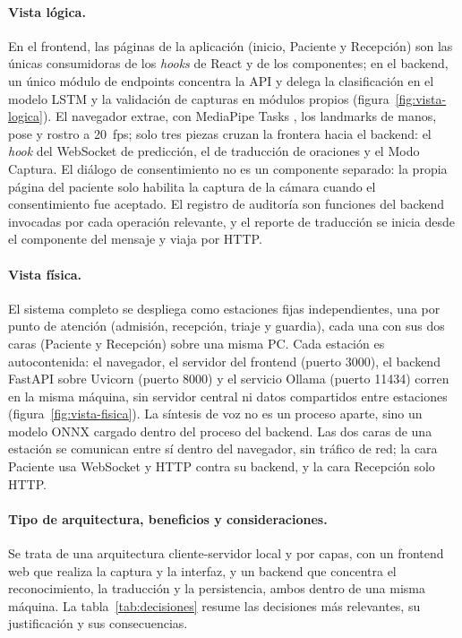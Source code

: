 \paragraph{Vista lógica.} En el frontend, las páginas de la aplicación (inicio, Paciente y Recepción) son las únicas consumidoras de los \emph{hooks} de React y de los componentes; en el backend, un único módulo de endpoints concentra la API y delega la clasificación en el modelo LSTM y la validación de capturas en módulos propios (figura~\ref{fig:vista-logica}). El navegador extrae, con MediaPipe Tasks \parencite{lugaresi2019mediapipe}, los landmarks de manos, pose y rostro a 20~fps; solo tres piezas cruzan la frontera hacia el backend: el \emph{hook} del WebSocket de predicción, el de traducción de oraciones y el Modo Captura. El diálogo de consentimiento no es un componente separado: la propia página del paciente solo habilita la captura de la cámara cuando el consentimiento fue aceptado. El registro de auditoría son funciones del backend invocadas por cada operación relevante, y el reporte de traducción se inicia desde el componente del mensaje y viaja por HTTP.


\paragraph{Vista física.} El sistema completo se despliega como estaciones fijas independientes, una por punto de atención (admisión, recepción, triaje y guardia), cada una con sus dos caras (Paciente y Recepción) sobre una misma PC. Cada estación es autocontenida: el navegador, el servidor del frontend (puerto 3000), el backend FastAPI sobre Uvicorn (puerto 8000) y el servicio Ollama (puerto 11434) corren en la misma máquina, sin servidor central ni datos compartidos entre estaciones (figura~\ref{fig:vista-fisica}). La síntesis de voz no es un proceso aparte, sino un modelo ONNX cargado dentro del proceso del backend. Las dos caras de una estación se comunican entre sí dentro del navegador, sin tráfico de red; la cara Paciente usa WebSocket y HTTP contra su backend, y la cara Recepción solo HTTP.


\paragraph{Tipo de arquitectura, beneficios y consideraciones.} Se trata de una arquitectura cliente-servidor local y por capas, con un frontend web que realiza la captura y la interfaz, y un backend que concentra el reconocimiento, la traducción y la persistencia, ambos dentro de una misma máquina. La tabla~\ref{tab:decisiones} resume las decisiones más relevantes, su justificación y sus consecuencias.

